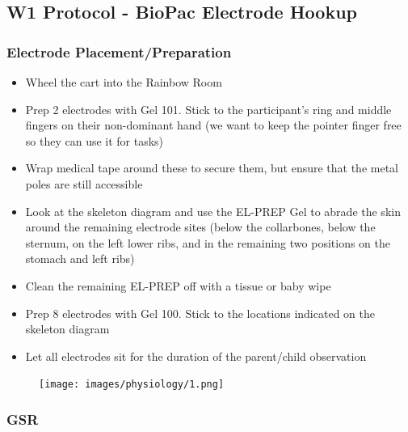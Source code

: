 \documentclass[
]{book}
\providecommand{\tightlist}{%
  \setlength{\itemsep}{0pt}\setlength{\parskip}{0pt}}
\begin{document}
\hypertarget{w1-protocol---biopac-electrode-hookup}{%
\subsection{W1 Protocol - BioPac Electrode Hookup}\label{w1-protocol---biopac-electrode-hookup}}

\hypertarget{electrode-placementpreparation}{%
\subsubsection{Electrode Placement/Preparation}\label{electrode-placementpreparation}}

\begin{itemize}
\tightlist
\item
  Wheel the cart into the Rainbow Room
\item
  Prep 2 electrodes with Gel 101. Stick to the participant's ring and middle fingers on their non-dominant hand (we want to keep the pointer finger free so they can use it for tasks)
\item
  Wrap medical tape around these to secure them, but ensure that the metal poles are still accessible
\item
  Look at the skeleton diagram and use the EL-PREP Gel to abrade the skin around the remaining electrode sites (below the collarbones, below the sternum, on the left lower ribs, and in the remaining two positions on the stomach and left ribs)
\item
  Clean the remaining EL-PREP off with a tissue or baby wipe
\item
  Prep 8 electrodes with Gel 100. Stick to the locations indicated on the skeleton diagram
\item
  Let all electrodes sit for the duration of the parent/child observation
\end{itemize}

\begin{figure}
\centering
\texttt{[image: images/physiology/1.png]}
\caption{}
\end{figure}

\hypertarget{gsr}{%
\subsubsection{GSR}\label{gsr}}
\end{document}
